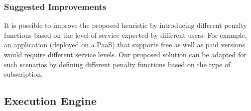 \subsubsection{Suggested Improvements}

It is possible to improve the proposed heuristic by introducing different penalty functions  based on the level of service expected by different users. For example, an application (deployed on a PaaS) that supports free as well as paid versions would require different service levels. Our proposed solution can be adapted for such scenarios by defining different penalty functions based on the type of subscription.

\subsection{Execution Engine}